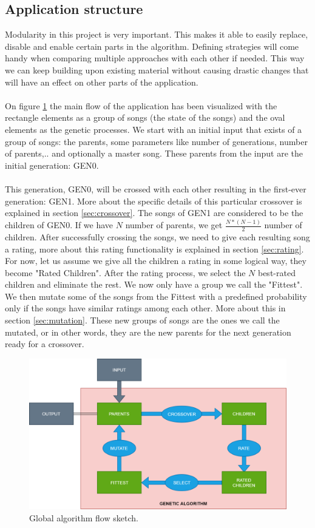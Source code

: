 \documentclass[a4paper]{article}
\begin{document}
\subsection{Application structure}
Modularity in this project is very important. This makes it able to easily replace, disable and enable certain parts in the algorithm. Defining strategies will come handy when comparing multiple approaches with each other if needed. This way we can keep building upon existing material without causing drastic changes that will have an effect on other parts of the application.
\\\\
On figure \ref{fig:App_structure} the main flow of the application has been visualized with the rectangle elements as a group of songs (the state of the songs) and the oval elements as the genetic processes. We start with an initial input that exists of a group of songs: the parents, some parameters like number of generations, number of parents,.. and optionally a master song. These parents from the input are the initial generation: GEN0. 
\\\\
This generation, GEN0, will be crossed with each other resulting in the first-ever generation: GEN1. More about the specific details of this particular crossover is explained in section \ref{sec:crossover}. The songs of GEN1 are considered to be the children of GEN0. If we have \(N\) number of parents, we get \( \frac{N * (N-1)}{2} \) number of children. After successfully crossing the songs, we need to give each resulting song a rating, more about this rating functionality is explained in section \ref{sec:rating}. For now, let us assume we give all the children a rating in some logical way, they become "Rated Children". After the rating process, we select the \(N\) best-rated children and eliminate the rest. We now only have a group we call the "Fittest". We then mutate some of the songs from the Fittest with a predefined probability only if the songs have similar ratings among each other. More about this in section \ref{sec:mutation}. These new groups of songs are the ones we call the mutated, or in other words, they are the new parents for the next generation ready for a crossover.


\begin{figure}[H]
	\includegraphics[width=\textwidth]{Fotos/App_structure.png}
	\caption{Global algorithm flow sketch.}
	\label{fig:App_structure}
\end{figure}
\end{document}
